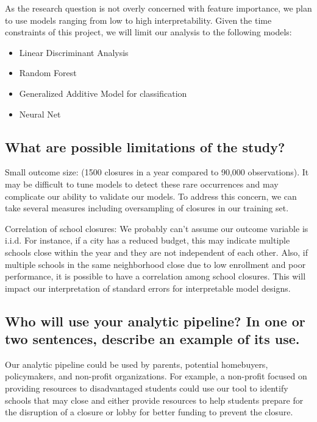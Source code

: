 \documentclass[twoside,11pt]{article}
\begin{document}
As the research question is not overly concerned with feature importance, we plan to use models ranging from low to high interpretability. Given the time constraints of this project, we will limit our analysis to the following models:
\begin{itemize}
    \item Linear Discriminant Analysis
    \item Random Forest
    \item Generalized Additive Model for classification
    \item Neural Net
\end{itemize}

\subsection{What are possible limitations of the study?}

Small outcome size: (1500 closures in a year compared to 90,000 observations). It may be difficult to tune models to detect these rare occurrences and may complicate our ability to validate our models. To address this concern, we can take several measures including oversampling of closures in our training set.

Correlation of school closures: We probably can’t assume our outcome variable is i.i.d.  For instance, if a city has a reduced budget, this may indicate multiple schools close within the year and they are not independent of each other. Also, if multiple schools in the same neighborhood close due to low enrollment and poor performance, it is possible to have a correlation among school closures. This will impact our interpretation of standard errors for interpretable model designs. 


\subsection{Who will use your analytic pipeline? In one or two sentences, describe an example of its use.}
Our analytic pipeline could be used by parents, potential homebuyers, policymakers, and non-profit organizations. For example, a non-profit focused on providing resources to disadvantaged students could use our tool to identify schools that may close and either provide resources to help students prepare for the disruption of a closure or lobby for better funding to prevent the closure. 






\end{document}
